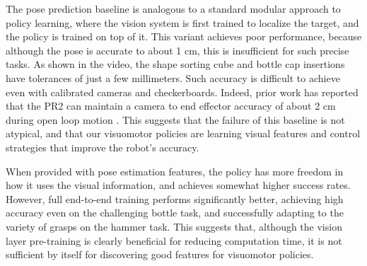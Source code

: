 \documentclass[final]{IEEEtran}
\begin{document}
The pose prediction baseline is analogous to a standard modular approach to policy learning, where the vision system is first trained to localize the target, and the policy is trained on top of it. This variant achieves poor performance, because although the pose is accurate to about 1 cm, this is insufficient for such precise tasks. As shown in the video, the shape sorting cube and bottle cap insertions have tolerances of just a few millimeters. Such accuracy is difficult to achieve even with calibrated cameras and checkerboards. Indeed, prior work has reported that the PR2 can maintain a camera to end effector accuracy of about 2 cm during open loop motion \cite{mwgcm-adopi-10}. This suggests that the failure of this baseline is not atypical, and that our visuomotor policies are learning visual features and control strategies that improve the robot's accuracy.


When provided with pose estimation features, the policy has more freedom in how it uses the visual information, and achieves somewhat higher success rates. However, full end-to-end training performs significantly better, achieving high accuracy even on the challenging bottle task, and successfully adapting to the variety of grasps on the hammer task. This suggests that, although the vision layer pre-training is clearly beneficial for reducing computation time, it is not sufficient by itself for discovering good features for visuomotor policies.
\end{document}

